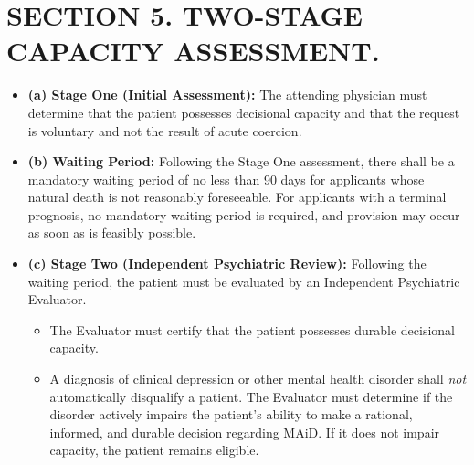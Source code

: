 \documentclass[11pt]{article}
\begin{document}
\section*{SECTION 5. TWO-STAGE CAPACITY ASSESSMENT.}
\begin{itemize}
    \item \textbf{(a) Stage One (Initial Assessment):} The attending physician must determine that the patient possesses decisional capacity and that the request is voluntary and not the result of acute coercion.
    \item \textbf{(b) Waiting Period:} Following the Stage One assessment, there shall be a mandatory waiting period of no less than 90 days for applicants whose natural death is not reasonably foreseeable. For applicants with a terminal prognosis, no mandatory waiting period is required, and provision may occur as soon as is feasibly possible.
    \item \textbf{(c) Stage Two (Independent Psychiatric Review):} Following the waiting period, the patient must be evaluated by an Independent Psychiatric Evaluator. 
    \begin{itemize}
        \item[(1)] The Evaluator must certify that the patient possesses durable decisional capacity.
        \item[(2)] A diagnosis of clinical depression or other mental health disorder shall \textit{not} automatically disqualify a patient. The Evaluator must determine if the disorder actively impairs the patient's ability to make a rational, informed, and durable decision regarding MAiD. If it does not impair capacity, the patient remains eligible.
    \end{itemize}
\end{itemize}
\end{document}
